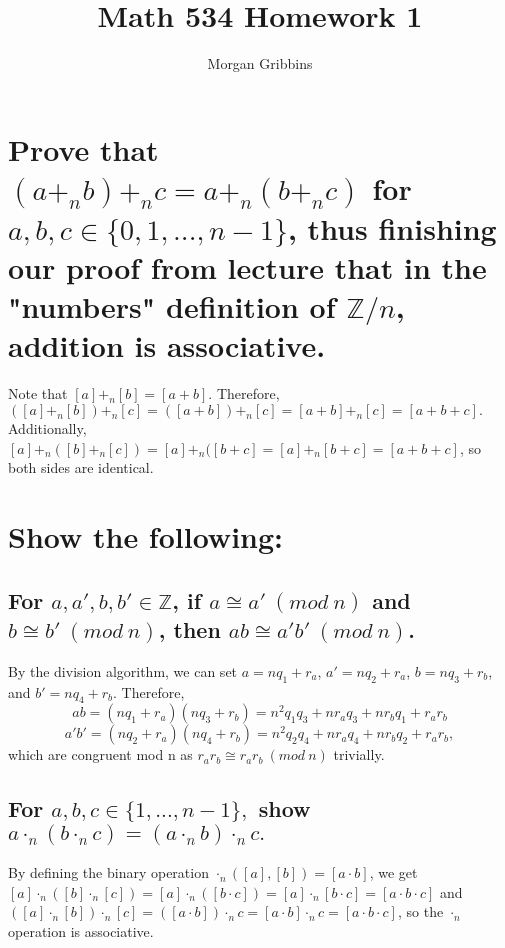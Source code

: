 \documentclass[12pt,letterpaper]{article}
\title{Math 534 Homework 1}
\author{Morgan Gribbins}
\begin{document}
	
\maketitle

\section{Prove that \((a +_{n} b) +_{n} c = a +_{n} (b +_{n} c)\) for \(a,b,c \in \{0,1,...,n-1\}\), thus finishing our proof from lecture that in the "numbers" definition of \(\mathbb{Z}/n\), addition is associative.}

	Note that \([a] +_{n} [b] = [a + b]\). Therefore, \(([a] +_{n} [b]) +_{n} [c] = ([a + b]) +_{n} [c] = [a + b] +_{n} [c] = [a + b + c].\) Additionally, \([a] +_{n} ([b] +_{n} [c]) = [a] +_{n} ([b + c] = [a] +_{n} [b + c] = [a + b + c]\), so both sides are identical.
	
\section{Show the following:}

\subsection{For \(a,a',b,b' \in \mathbb{Z}\), if \(a \cong a'\ (mod\ n)\) and \(b \cong b'\ (mod\ n)\), then \(ab \cong a'b'\ (mod\ n)\).}

	By the division algorithm, we can set \(a = nq_{1} + r_{a}\), \(a' = nq_{2} + r_{a}\), \(b = nq_{3} + r_{b}\), and \(b' = nq_{4} + r_{b}\). Therefore, \[ab = (nq_{1} + r_{a})(nq_{3} + r_{b}) = n^{2}q_{1}q_{3} + nr_{a}q_{3} + nr_{b}q_{1} + r_{a}r_{b}\] \[a'b' = (nq_{2} + r_{a})(nq_{4} + r_{b}) = n^{2}q_{2}q_{4} + nr_{a}q_{4} + nr_{b}q_{2} + r_{a}r_{b},\] which are congruent mod n as \(r_{a}r_{b} \cong r_{a}r_{b}\ (mod\ n)\) trivially.
	
\subsection{For \(a,b,c \in \{1,...,n-1\},\) show \(a \cdot_{n} (b \cdot_{n} c) = (a \cdot_{n} b) \cdot_{n} c. \)}

	By defining the binary operation \(\cdot_{n}([a],[b]) = [a\cdot b]\), we get \([a]\cdot_{n} ([b] \cdot_{n} [c])  = [a] \cdot_{n} ([b \cdot c]) = [a]\cdot_{n} [b \cdot c] = [a \cdot b \cdot c]\) and \(([a]\cdot_{n} [b]) \cdot_{n} [c]  = ([a\cdot b]) \cdot_{n} c = [a \cdot b] \cdot_{n} c = [a \cdot b \cdot c]\), so the \(\cdot_{n}\) operation is associative.
	
\end{document}
